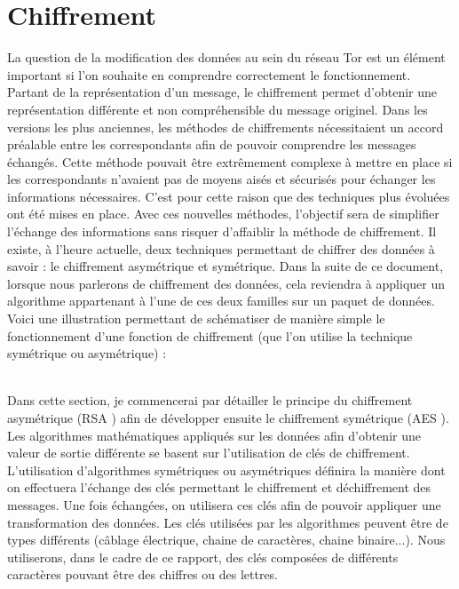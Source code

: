\documentclass[letterpaper]{article}
\begin{document}
\section{Chiffrement}
La question de la modification des données au sein du réseau Tor est un élément important si l'on souhaite en comprendre correctement le fonctionnement. Partant de la représentation d'un message, le chiffrement permet d'obtenir une représentation différente et non compréhensible du message originel. Dans les versions les plus anciennes, les méthodes de chiffrements nécessitaient un accord préalable entre les correspondants afin de pouvoir comprendre les messages échangés. Cette méthode pouvait être extrêmement complexe à mettre en place si les correspondants n'avaient pas de moyens aisés et sécurisés pour échanger les informations nécessaires. C'est pour cette raison que des techniques plus évoluées ont été mises en place. Avec ces nouvelles méthodes, l'objectif sera de simplifier l'échange des informations sans risquer d'affaiblir la méthode de chiffrement. Il existe, à l'heure actuelle, deux techniques permettant de chiffrer des données à savoir : le chiffrement asymétrique et symétrique. Dans la suite de ce document, lorsque nous parlerons de chiffrement des données, cela reviendra à appliquer un algorithme appartenant à l'une de ces deux familles sur un paquet de données. Voici une illustration permettant de schématiser de manière simple le fonctionnement d'une fonction de chiffrement (que l'on utilise la technique symétrique ou asymétrique) : \\ 

 \\

Dans cette section, je commencerai par détailler le principe du chiffrement asymétrique (RSA \cite{ref6}) afin de développer ensuite le chiffrement symétrique (AES \cite{ref8}). Les algorithmes mathématiques appliqués sur les données afin d'obtenir une valeur de sortie différente se basent sur l'utilisation de clés de chiffrement. L'utilisation d'algorithmes symétriques ou asymétriques définira la manière dont on effectuera l'échange des clés permettant le chiffrement et déchiffrement des messages. Une fois échangées, on utilisera ces clés afin de pouvoir appliquer une transformation des données. Les clés utilisées par les algorithmes peuvent être de types différents (câblage électrique, chaine de caractères, chaine binaire...). Nous utiliserons, dans le cadre de ce rapport, des clés composées de différents caractères pouvant être des chiffres ou des lettres.
\end{document}
